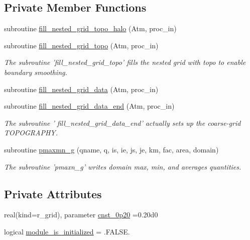 \subsection*{Private Member Functions}
\begin{DoxyCompactItemize}
\item 
subroutine \hyperlink{classfv__restart__mod_a12dc324285c0ec23f0c742d06d2b637f}{fill\-\_\-nested\-\_\-grid\-\_\-topo\-\_\-halo} (Atm, proc\-\_\-in)
\item 
subroutine \hyperlink{classfv__restart__mod_ac212a456cf892280643929f21d2cd55f}{fill\-\_\-nested\-\_\-grid\-\_\-topo} (Atm, proc\-\_\-in)
\begin{DoxyCompactList}\small\item\em The subroutine 'fill\-\_\-nested\-\_\-grid\-\_\-topo' fills the nested grid with topo to enable boundary smoothing. \end{DoxyCompactList}\item 
subroutine \hyperlink{classfv__restart__mod_a54c619910fcd65101de5606a7d0b80ce}{fill\-\_\-nested\-\_\-grid\-\_\-data} (Atm, proc\-\_\-in)
\item 
subroutine \hyperlink{classfv__restart__mod_a1ec25741812e135900a2d3f2f4c9d33f}{fill\-\_\-nested\-\_\-grid\-\_\-data\-\_\-end} (Atm, proc\-\_\-in)
\begin{DoxyCompactList}\small\item\em The subroutine ' fill\-\_\-nested\-\_\-grid\-\_\-data\-\_\-end' actually sets up the coarse-\/grid T\-O\-P\-O\-G\-R\-A\-P\-H\-Y. \end{DoxyCompactList}\item 
subroutine \hyperlink{classfv__restart__mod_a1e1dd2798792970c4e9977ce480e5b4a}{pmaxmn\-\_\-g} (qname, q, is, ie, js, je, km, fac, area, domain)
\begin{DoxyCompactList}\small\item\em The subroutine 'pmaxn\-\_\-g' writes domain max, min, and averages quantities. \end{DoxyCompactList}\end{DoxyCompactItemize}
\subsection*{Private Attributes}
\begin{DoxyCompactItemize}
\item 
real(kind=r\-\_\-grid), parameter \hyperlink{classfv__restart__mod_a2b60f0f737ab9928fd9c6ccbd7daf754}{cnst\-\_\-0p20} =0.\-20d0
\item 
logical \hyperlink{classfv__restart__mod_acf880b4cfc12d08f29edb14fd1ca6a32}{module\-\_\-is\-\_\-initialized} = .F\-A\-L\-S\-E.
\end{DoxyCompactItemize}


